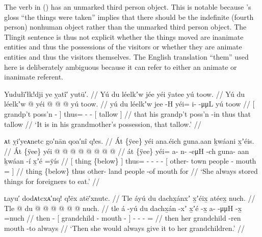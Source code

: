 The verb in (\lastx) has an unmarked third person object.
This is notable because \citeauthor{swanton:1909}’s gloss “the things were taken” implies that there should be the indefinite (fourth person) nonhuman object  rather than the unmarked third person object.
The Tlingit sentence is thus not explicit whether the things moved are inanimate entities and thus the possessions of the visitors or whether they are animate entities and thus the visitors themselves.
The English translation “them” used here is deliberately ambiguous because it can refer to either an animate or inanimate referent.

\ex\label{ex:92-8-his-grandmother-has-the-tallow}%
%
\begingl
	\glpreamble	Yudułī′łk!dji ye ỵatî′ yutū′. //
	\glpreamble	Yú du léelkʼw jée yéi ÿatee yú toow. //
	\gla	{} Yú du léelkʼw  @ {} {}
		yéi @  @ {} @ {}
		{} yú toow. {} //
	\glb	{} yú du léelkʼw jee -H {}
		yéi= i-  -μμL
		{} yú toow {} //
	\glc	{}[   grandp’t poss’n - {}]
		thus= -  -
		{}[  tallow {}] //
	\gld	{} that his grandp’t poss’n -in {}
		thus  {} {}
		{} that tallow {} //
	\glft	‘It is in his grandmother’s possession, that tallow.’
		//
\endgl%
\xe

\ex\label{ex:92-9-stored-things-for-foreigners}%
%
\begingl
	\glpreamble	ᴀt ỵi′yeᴀnetc go′nān qoa′nî q!es. //
	\glpreamble	Át \{ÿee\} yéi ana.éich g̱una.aan ḵwáani x̱ʼéis. //
	\gla	{} Át \{ÿee\} {}
		yéi @  @ {} @ {} @ {} @ {}
		{}  @ {}  @ {}  @ {} {} //
	\glb	{} át \{ÿee\} {}
		yéi= a- n-  -eμH -ch
		{} g̱una- aan ḵwáan -í x̱ʼé =ÿís {} //
	\glc	{}[ thing \{below\} {}]
		thus= - -  - -
		{}[ other- town people - mouth = {}] //
	\gld	{} thing \{below\} {}
		thus  {} {} {} {}
		{} other- land people -of mouth \•for {} //
	\glft	‘She always stored things for foreigners to eat.’
		//
\endgl
\xe


\ex\label{ex:92-10-give-to-grandchildren}%
%
\begingl
	\glpreamble	ʟayu′ dodᴀtcxᴀ′nq! q!ēx atē′xnutc. //
	\glpreamble	Tle áyú du dachx̱ánxʼ x̱ʼéix̱ atéex̱ nuch. //
	\gla	Tle  @ {}
		{} du  @ {}  @ {} {}
		 @ {} @ {} @ {} @ \•nuch. //
	\glb	tle á -yú
		{} du dachx̱án -xʼ x̱ʼé -x̱ {}
		a-  -μμH -x̱ =nuch //
	\glc	then  -
		{}[  grandchild - mouth - {}]
		-  - - = //
	\gld	then  {}
		{} her grandchild -ren mouth -to {}
		 {} {} {} \•always //
	\glft	‘Then she would always give it to her grandchildren.’
		//
\endgl
\xe


